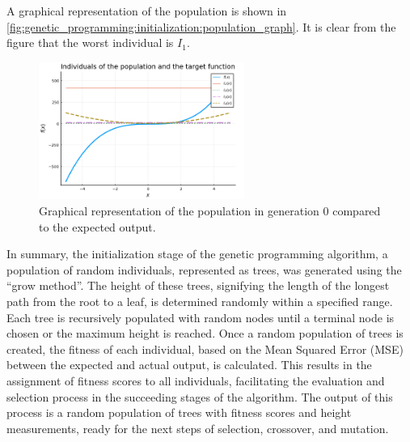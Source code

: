   A graphical representation of the population is shown in
  \vref{fig:genetic_programming:initialization:population_graph}.
  It is clear from the figure that the worst individual is \(I_1\).

  \begin{figure}[ht!]
    \centering
    \includegraphics[width=0.6\textwidth]{img/theoretical_framework/gp_pop_init.png}
    \caption{
      Graphical representation of the population in generation 0 compared to the
      expected output.
    }
    \label{fig:genetic_programming:initialization:population_graph}
  \end{figure}

  
  In summary, the initialization stage of the genetic programming algorithm, a 
  population of random individuals, represented as trees, was generated using 
  the \enquote{grow method}.
  The height of these trees, signifying the length of the longest path from the
  root to a leaf, is determined randomly within a specified range.
  Each tree is recursively populated with random nodes until a terminal node is
  chosen or the maximum height is reached.
  Once a random population of trees is created, the fitness of each individual,
  based on the Mean Squared Error (MSE) between the expected and actual output,
  is calculated.
  This results in the assignment of fitness scores to all individuals,
  facilitating the evaluation and selection process in the succeeding stages of
  the algorithm.
  The output of this process is a random population of trees with fitness scores
  and height measurements, ready for the next steps of selection, crossover, and
  mutation.
